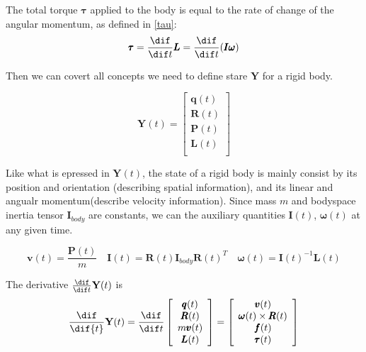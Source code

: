 The total torque $\pmb{\tau}$ applied to the body is equal to the rate of change of the angular momentum, as defined in \ref{tau}:
\begin{equation}
    \pmb{\tau} = \frac{\dif}{\dif t }\pmb{L} = \frac{\dif}{\dif t }(\pmb{I}\pmb{\omega})
    \label{tau}
\end{equation}

 Then we can covert all concepts we need to define stare $\textbf{Y}$ for a rigid body.

\begin{equation}
    \textbf{Y}(t) = \left[
        \begin{array}{c}
            \pmb{q}(t) \\
            \pmb{R}(t) \\
            \pmb{P}(t) \\
            \pmb{L}(t) \\
        \end{array}
    \right]
\end{equation}

Like what is epressed in $\textbf{Y}(t)$, the state of a rigid body is mainly consist by its position and orientation (describing spatial information), and its linear and angualr momentum(describe velocity information). Since mass $m$ and bodyspace inertia tensor $\pmb{I}_{body}$ are constants, we can the auxiliary quantities $\pmb{I}(t)$, $\pmb{\omega}(t)$ at any given time.

\begin{equation}
    \pmb{v}(t) = \frac{\pmb{P}(t)}{m} \quad
    \pmb{I}(t) = \pmb{R}(t)\pmb{I}_{body}\pmb{R}(t)^{T} \quad
    \pmb{\omega}(t) = \pmb{I}(t)^{-1}\pmb{L}(t)
\end{equation}

The derivative $\frac{\dif}{\dif t}\textbf{Y}(t)$ is
\begin{equation}
    \frac{\dif}{\dif{t}}\textbf{Y}(t) = \frac{\dif}{\dif t}\left[
        \begin{array}{c}
            \pmb{q}(t) \\
            \pmb{R}(t) \\
            m \pmb{v}(t) \\
            \pmb{L}(t) \\
        \end{array}
    \right] = \left[
        \begin{array}{c}
            \pmb{v}(t) \\
            \pmb{\omega}(t)\times\pmb{R}(t) \\
            \pmb{f}(t) \\
            \pmb{\tau}(t) \\
        \end{array}
    \right]
\end{equation}

